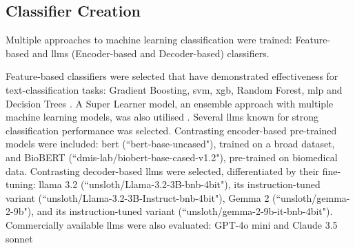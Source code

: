 \documentclass[pdflatex,sn-mathphys-num]{sn-jnl}%
\begin{document}



\subsection{Classifier Creation}\label{sec:Materials and Methods}




Multiple approaches to machine learning classification were trained: Feature-based and \glspl*{llm} (Encoder-based and Decoder-based) classifiers. 

Feature-based classifiers were selected that have demonstrated effectiveness for text-classification tasks: Gradient Boosting, \gls*{svm}, \gls*{xgb}, Random Forest, \gls*{mlp} and Decision Trees \cite{sebastiani2002machine,li2022survey}. A Super Learner model, an ensemble approach with multiple machine learning models, was also utilised \cite{van_noorden_more_2023}. Several \glspl*{llm} known for strong classification performance was selected.  Contrasting encoder-based pre-trained models were included: \gls*{bert} (``bert-base-uncased"), trained on a broad dataset, and BioBERT (``dmis-lab/biobert-base-cased-v1.2"), pre-trained on biomedical data.  Contrasting decoder-based \glspl*{llm} were selected, differentiated by their fine-tuning: \gls*{llama} 3.2 (``unsloth/Llama-3.2-3B-bnb-4bit"), its instruction-tuned variant (``unsloth/Llama-3.2-3B-Instruct-bnb-4bit"), Gemma 2 (``unsloth/gemma-2-9b"), and its instruction-tuned variant (``unsloth/gemma-2-9b-it-bnb-4bit"). Commercially available \glspl*{llm} were also evaluated: GPT-4o mini \cite{noauthor_openai_nodate} and Claude 3.5 sonnet \cite{noauthor_introducing_nodate}
\end{document}
